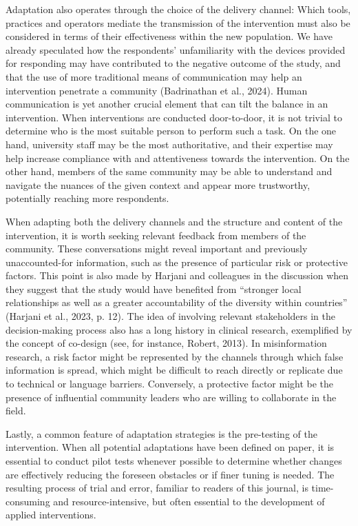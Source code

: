 \documentclass[authordate, reflection]{jote-new-article}
\begin{document}
	Adaptation also operates through the choice of the delivery channel: Which tools, practices and operators mediate the transmission of the intervention must also be considered in terms of their effectiveness within the new population. We have already speculated how the respondents' unfamiliarity with the devices provided for responding may have contributed to the negative outcome of the study, and that the use of more traditional means of communication may help an intervention penetrate a community (Badrinathan et al., 2024). Human communication is yet another crucial element that can tilt the balance in an intervention. When interventions are conducted door-to-door, it is not trivial to determine who is the most suitable person to perform such a task. On the one hand, university staff may be the most authoritative, and their expertise may help increase compliance with and attentiveness towards the intervention. On the other hand, members of the same community may be able to understand and navigate the nuances of the given context and appear more trustworthy, potentially reaching more respondents.



	When adapting both the delivery channels and the structure and content of the intervention, it is worth seeking relevant feedback from members of the community. These conversations might reveal important and previously unaccounted-for information, such as the presence of particular risk or protective factors. This point is also made by Harjani and colleagues in the discussion when they suggest that the study would have benefited from “stronger local relationships as well as a greater accountability of the diversity within countries” (Harjani et al., 2023, p. 12). The idea of involving relevant stakeholders in the decision-making process also has a long history in clinical research, exemplified by the concept of co-design (see, for instance, Robert, 2013). In misinformation research, a risk factor might be represented by the channels through which false information is spread, which might be difficult to reach directly or replicate due to technical or language barriers. Conversely, a protective factor might be the presence of influential community leaders who are willing to collaborate in the field.



	Lastly, a common feature of adaptation strategies is the pre-testing of the intervention. When all potential adaptations have been defined on paper, it is essential to conduct pilot tests whenever possible to determine whether changes are effectively reducing the foreseen obstacles or if finer tuning is needed. The resulting process of trial and error, familiar to readers of this journal, is time-consuming and resource-intensive, but often essential to the development of applied interventions.
\end{document}
